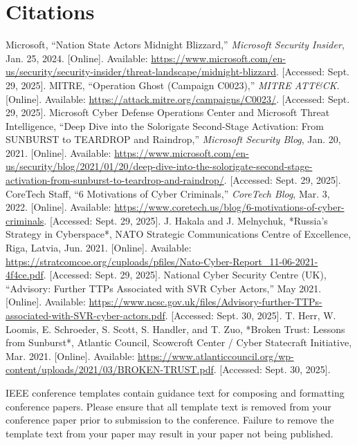 \documentclass[conference]{IEEEtran}
\begin{document}
\section*{Citations}


\begin{thebibliography}{}
 Microsoft, ``Nation State Actors Midnight Blizzard,'' \emph{Microsoft Security Insider}, Jan. 25, 2024. [Online]. Available: \url{https://www.microsoft.com/en-us/security/security-insider/threat-landscape/midnight-blizzard}. [Accessed: Sept. 29, 2025].
 MITRE, ``Operation Ghost (Campaign C0023),'' \emph{MITRE ATT\&CK}. [Online]. Available: \url{https://attack.mitre.org/campaigns/C0023/}. [Accessed: Sept. 29, 2025].
 Microsoft Cyber Defense Operations Center and Microsoft Threat Intelligence, ``Deep Dive into the Solorigate Second-Stage Activation: From SUNBURST to TEARDROP and Raindrop,'' \emph{Microsoft Security Blog}, Jan. 20, 2021. [Online]. Available: \url{https://www.microsoft.com/en-us/security/blog/2021/01/20/deep-dive-into-the-solorigate-second-stage-activation-from-sunburst-to-teardrop-and-raindrop/}. [Accessed: Sept. 29, 2025].
 CoreTech Staff, ``6 Motivations of Cyber Criminals,'' \emph{CoreTech Blog}, Mar. 3, 2022. [Online]. Available: \url{https://www.coretech.us/blog/6-motivations-of-cyber-criminals}. [Accessed: Sept. 29, 2025].
 J. Hakala and J. Melnychuk, *Russia’s Strategy in Cyberspace*, NATO Strategic Communications Centre of Excellence, Riga, Latvia, Jun. 2021. [Online]. Available: \url{https://stratcomcoe.org/cuploads/pfiles/Nato-Cyber-Report_11-06-2021-4f4ce.pdf}. [Accessed: Sept. 29, 2025].
 National Cyber Security Centre (UK), ``Advisory: Further TTPs Associated with SVR Cyber Actors,'' May 2021. [Online]. Available: \url{https://www.ncsc.gov.uk/files/Advisory-further-TTPs-associated-with-SVR-cyber-actors.pdf}. [Accessed: Sept. 30, 2025].
 T. Herr, W. Loomis, E. Schroeder, S. Scott, S. Handler, and T. Zuo, *Broken Trust: Lessons from Sunburst*, Atlantic Council, Scowcroft Center / Cyber Statecraft Initiative, Mar. 2021. [Online]. Available: \url{https://www.atlanticcouncil.org/wp-content/uploads/2021/03/BROKEN-TRUST.pdf}. [Accessed: Sept. 30, 2025].
\end{thebibliography}
\vspace{12pt}
\color{red}
IEEE conference templates contain guidance text for composing and formatting conference papers. Please ensure that all template text is removed from your conference paper prior to submission to the conference. Failure to remove the template text from your paper may result in your paper not being published.
\end{document}
